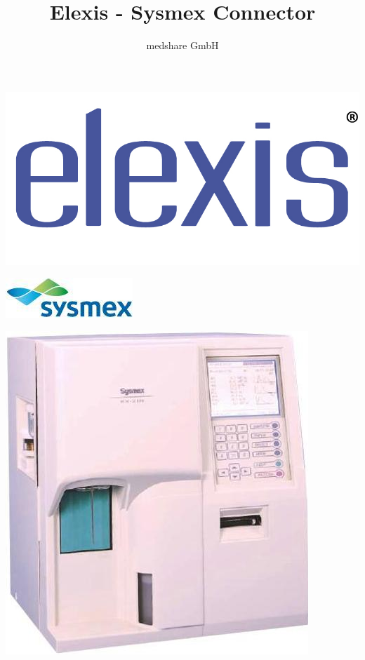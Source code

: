 \documentclass[a4paper]{scrartcl}
\title{Elexis - Sysmex Connector}
\author{medshare GmbH}
\begin{document}
\maketitle
	\begin{center}
		\includegraphics{elexis_logo}
	\end{center}
	\begin{center}
		\includegraphics{sysmex_logo}
	\end{center}
	\begin{center}
		\includegraphics{sysmex_device}
	\end{center}
\pagebreak
\end{document}
